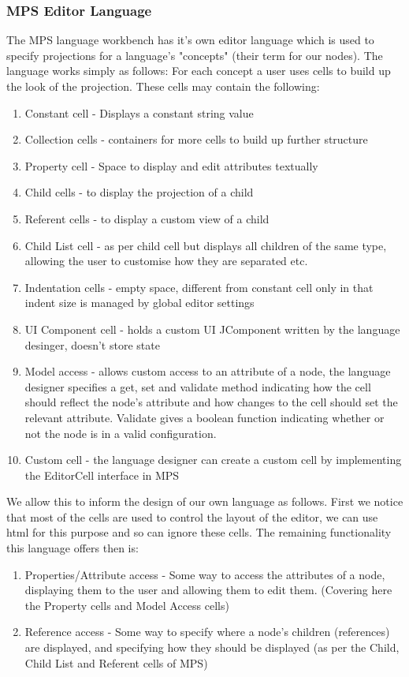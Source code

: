 \documentclass{article}
\begin{document}
\subsubsection{MPS Editor Language}
The MPS language workbench has it's own editor language\cite{mpsEditorLanguage} which is used to specify projections for a language's "concepts" (their term for our nodes). The language works simply as follows: For each concept a user uses cells to build up the look of the projection. These cells may contain the following:
\begin{enumerate}
\item Constant cell - Displays a constant string value
\item Collection cells - containers for more cells to build up further structure
\item Property cell - Space to display and edit attributes textually
\item Child cells - to display the projection of a child
\item Referent cells - to display a custom view of a child
\item Child List cell - as per child cell but displays all children of the same type, allowing the user to customise how they are separated etc.
\item Indentation cells - empty space, different from constant cell only in that indent size is managed by global editor settings
\item UI Component cell - holds a custom UI JComponent written by the language desinger, doesn't store state
\item Model access - allows custom access to an attribute of a node, the language designer specifies a get, set and validate method indicating how the cell should reflect the node's attribute and how changes to the cell should set the relevant attribute. Validate gives a boolean function indicating whether or not the node is in a valid configuration.
\item Custom cell - the language designer can create a custom cell by implementing the EditorCell interface in MPS
\end{enumerate}
%
We allow this to inform the design of our own language as follows. First we notice that most of the cells are used to control the layout of the editor, we can use html for this purpose and so can ignore these cells. The remaining functionality this language offers then is:
\begin{enumerate}
\item Properties/Attribute access - Some way to access the attributes of a node, displaying them to the user and allowing them to edit them.  (Covering here the Property cells and Model Access cells)
\item Reference access - Some way to specify where a node's children (references) are displayed, and specifying how they should be displayed (as per the Child, Child List and Referent cells of MPS)
\end{enumerate}
\end{document}
